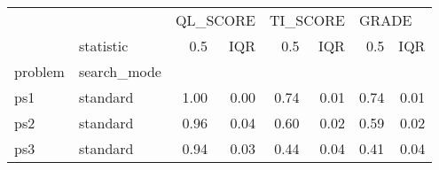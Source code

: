 \begin{tabular}{llrrrrrr}
\toprule
    & {} & \multicolumn{2}{l}{QL\_SCORE} & \multicolumn{2}{l}{TI\_SCORE} & \multicolumn{2}{l}{GRADE} \\
    & statistic &      0.5 &  IQR &      0.5 &  IQR &   0.5 &  IQR \\
problem & search\_mode &          &      &          &      &       &      \\
\midrule
ps1 & standard &     1.00 & 0.00 &     0.74 & 0.01 &  0.74 & 0.01 \\
ps2 & standard &     0.96 & 0.04 &     0.60 & 0.02 &  0.59 & 0.02 \\
ps3 & standard &     0.94 & 0.03 &     0.44 & 0.04 &  0.41 & 0.04 \\
\bottomrule
\end{tabular}
